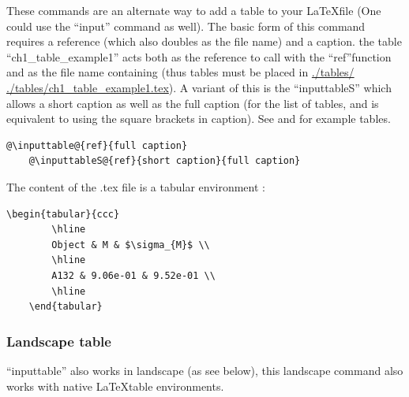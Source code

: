     These commands are an alternate way to add a table to your \LaTeX file (One could use the ``input'' command as well). The basic form of this command requires a reference (which also doubles as the file name) and a caption. \ie the table ``ch1\_table\_example1'' acts both as the reference to call with the ``ref''function and as the file name containing (thus tables must be placed in \url{./tables/} \ie \url{./tables/ch1_table_example1.tex}). A variant of this is the ``inputtableS'' which allows a short caption as well as the full caption (for the list of tables, and is equivalent to using the square brackets in caption). See  and  for example tables.

    \begin{lstlisting}[style=base]
    @\inputtable@{ref}{full caption}
    @\inputtableS@{ref}{short caption}{full caption}
    \end{lstlisting}



    The content of the .tex file is a tabular environment \ie:

    \begin{lstlisting}[style=base]
    \begin{tabular}{ccc}
        \hline
        Object & M & $\sigma_{M}$ \\
        \hline
        A132 & 9.06e-01 & 9.52e-01 \\
        \hline
    \end{tabular}
    \end{lstlisting}

    \subsubsection{Landscape table}
        \label{ch1_section_using_this}

    ``inputtable'' also works in landscape (as see below), this landscape command also works with native \LaTeX table environments.


